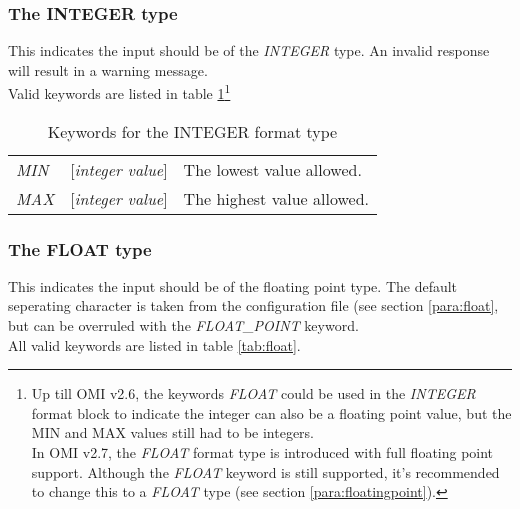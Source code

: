 \documentclass[a4paper]{book}
\begin{document}
\subsubsection{The INTEGER type}
\label{para:mylabel4}

This indicates the input should be of the \textsl{INTEGER} 
type. An invalid response will 
result in a warning message. \\
Valid keywords are listed in table \ref{tab:integer}\footnote{ Up till OMI v2.6, the keywords \textsl{FLOAT} could be used in the \textsl{INTEGER} format block to indicate the integer can also be a floating point value, but the MIN and MAX values still had to be integers.\\
In OMI v2.7, the \textsl{FLOAT} format type is introduced with full floating point support. Although the \textsl{FLOAT} keyword is still supported, it's recommended to change this to a \textsl{FLOAT} type (see section \ref{para:floatingpoint}).}

\begin{table}[h!tb]
\begin{minipage}[h!tb]{\textwidth}
\begin{tabular}{llp{6cm}} \hline
\textsl{MIN} & [\textit{integer value}] & The lowest value allowed. \\
\textsl{MAX} & [\textit{integer value}] & The highest value allowed. \\
\end{tabular}
\caption{Keywords for the INTEGER format type}\label{tab:integer}
\end{minipage}
\end{table}

\subsubsection{The FLOAT type}
\label{para:floatingpoint}

This indicates the input should be of the floating point type. The default seperating character is taken from the configuration file (see section \ref{para:float}, but can be overruled with the \textsl{FLOAT{\_}POINT} keyword. \\
All valid keywords are listed in table \ref{tab:float}.
\end{document}
